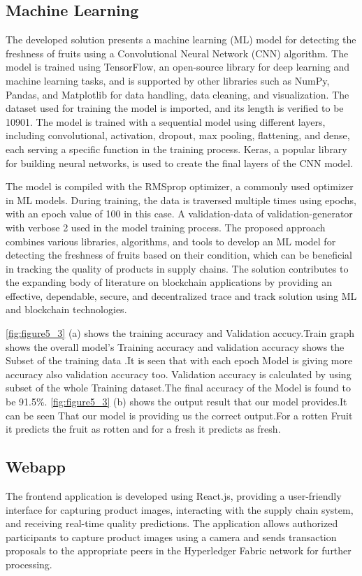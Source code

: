 \subsection{Machine Learning}
\noindent 
The developed solution presents a machine learning (ML) model for detecting the freshness of fruits using a Convolutional Neural Network (CNN) algorithm. The model is trained using TensorFlow, an open-source library for deep learning and machine learning tasks, and is supported by other libraries such as NumPy, Pandas, and Matplotlib for data handling, data cleaning, and visualization. The dataset used for training the model is imported, and its length is verified to be 10901. The model is trained with a sequential model using different layers, including convolutional, activation, dropout, max pooling, flattening, and dense, each serving a specific function in the training process. Keras, a popular library for building neural networks, is used to create the final layers of the CNN model.
\par The model is compiled with the RMSprop optimizer, a commonly used optimizer in ML models. During training, the data is traversed multiple times using epochs, with an epoch value of 100 in this case. A validation-data of validation-generator with verbose 2 used  in the model training process. The proposed approach combines various libraries, algorithms, and tools to develop an ML model for detecting the freshness of fruits based on their condition, which can be beneficial in tracking the quality of products in supply chains. The solution contributes to the expanding body of literature on blockchain applications by providing an effective, dependable, secure, and decentralized trace and track solution using ML and blockchain technologies.

\noindent \ref{fig:figure5_3} (a) shows the training accuracy and Validation accucy.Train graph shows the overall model’s Training accuracy and validation accuracy shows the Subset of the training data .It is seen that with each epoch Model is giving more accuracy also validation accuracy too. Validation accuracy is calculated by using subset of the whole 
Training dataset.The final accuracy of the Model is found to be 91.5\%.
\ref{fig:figure5_3} (b) shows the output result that our model  provides.It can be seen That our model is providing us the correct
output.For a rotten Fruit it predicts the fruit as rotten and for a fresh it predicts as fresh.

\subsection{Webapp}

\noindent The frontend application is developed using React.js, providing a user-friendly interface for capturing product images, interacting with the supply chain system, and receiving real-time quality predictions. The application allows authorized participants to capture product images using a camera and sends transaction proposals to the appropriate peers in the Hyperledger Fabric network for further processing.

